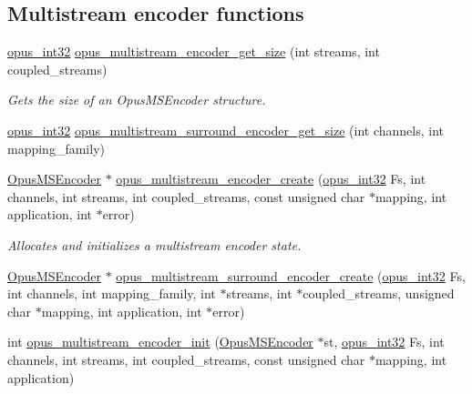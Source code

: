 \subsection*{Multistream encoder functions}
\begin{DoxyCompactItemize}
\item 
\hyperlink{opus__types_8h_aa4d309d6f80b99dbabebc8f98879ab9a}{opus\+\_\+int32} \hyperlink{group__opus__multistream_ga8642aa9cf16115229a655574d832293b}{opus\+\_\+multistream\+\_\+encoder\+\_\+get\+\_\+size} (int streams, int coupled\+\_\+streams)
\begin{DoxyCompactList}\small\item\em Gets the size of an Opus\+M\+S\+Encoder structure. \end{DoxyCompactList}\item 
\hyperlink{opus__types_8h_aa4d309d6f80b99dbabebc8f98879ab9a}{opus\+\_\+int32} \hyperlink{group__opus__multistream_ga9bed3af8a080ab97b8af48007758fa14}{opus\+\_\+multistream\+\_\+surround\+\_\+encoder\+\_\+get\+\_\+size} (int channels, int mapping\+\_\+family)
\item 
\hyperlink{group__opus__multistream_gae5826674d142fc873ebc1d781c507dd7}{Opus\+M\+S\+Encoder} $\ast$ \hyperlink{group__opus__multistream_gaeb64c648ed8155f824ca8d9a93ccecae}{opus\+\_\+multistream\+\_\+encoder\+\_\+create} (\hyperlink{opus__types_8h_aa4d309d6f80b99dbabebc8f98879ab9a}{opus\+\_\+int32} Fs, int channels, int streams, int coupled\+\_\+streams, const unsigned char $\ast$mapping, int application, int $\ast$error)
\begin{DoxyCompactList}\small\item\em Allocates and initializes a multistream encoder state. \end{DoxyCompactList}\item 
\hyperlink{group__opus__multistream_gae5826674d142fc873ebc1d781c507dd7}{Opus\+M\+S\+Encoder} $\ast$ \hyperlink{group__opus__multistream_ga8d87c08ecbe6ed4ce1ede4e58718b621}{opus\+\_\+multistream\+\_\+surround\+\_\+encoder\+\_\+create} (\hyperlink{opus__types_8h_aa4d309d6f80b99dbabebc8f98879ab9a}{opus\+\_\+int32} Fs, int channels, int mapping\+\_\+family, int $\ast$streams, int $\ast$coupled\+\_\+streams, unsigned char $\ast$mapping, int application, int $\ast$error)
\item 
int \hyperlink{group__opus__multistream_gae7586aa54c322fd9599de24b5c8b8c01}{opus\+\_\+multistream\+\_\+encoder\+\_\+init} (\hyperlink{group__opus__multistream_gae5826674d142fc873ebc1d781c507dd7}{Opus\+M\+S\+Encoder} $\ast$st, \hyperlink{opus__types_8h_aa4d309d6f80b99dbabebc8f98879ab9a}{opus\+\_\+int32} Fs, int channels, int streams, int coupled\+\_\+streams, const unsigned char $\ast$mapping, int application)

\end{DoxyCompactItemize}
